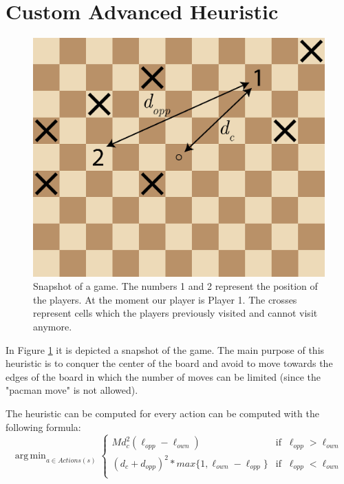 \documentclass[11pt]{scrartcl}
\DeclareMathOperator*{\argmin}{arg\,min}
\begin{document}
\section{Custom Advanced Heuristic}
\begin{figure}[t]
 \centering
 \includegraphics[width=\textwidth]{viz.eps}
 \caption{Snapshot of a game. The numbers 1 and 2 represent the position of the players. At the moment our player is Player 1. The crosses represent cells which the players previously visited and cannot visit anymore.}
 \label{fig:board}
\end{figure}

In Figure \ref{fig:board} it is depicted a snapshot of the game. The main purpose of this heuristic is to conquer the center of the board and avoid to move towards the edges of the board in which the number of moves can be limited (since the "pacman move" is not allowed).

The heuristic can be computed for every action can be computed with the following formula:
\begin{equation}
	\argmin_{a \in Actions(s)} \begin{cases}
		M d_c^2(\ell_{opp} - \ell_{own}) & \text{if} \;\; \ell_{opp} > \ell_{own}\\
		(d_c + d_{opp})^2 * max \{ 1, \ell_{own} - \ell_{opp}\} & \text{if} \;\; \ell_{opp} < \ell_{own}\\
	\end{cases}
\end{equation}
\end{document}
